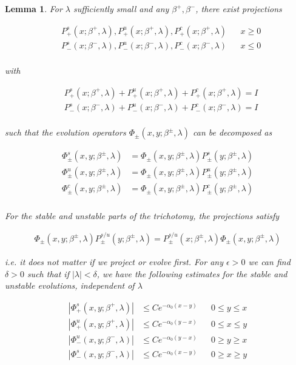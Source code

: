 \documentclass[12pt]{article}
\newtheorem{lemma}{Lemma}
\begin{document}
\begin{lemma}\label{trichotomy}
For $\lambda$ sufficiently small and any $\beta^+, \beta^-$, there exist projections

\begin{align*}
&P_+^s(x; \beta^+, \lambda), P_+^u(x; \beta^+, \lambda), P_+^c(x; \beta^+, \lambda) && x \geq 0 \\
&P_-^s(x; \beta^-, \lambda), P_-^u(x; \beta^-, \lambda), P_-^c(x; \beta^-, \lambda) && x \leq 0 \\
\end{align*}

with

\begin{align*}
&P_+^s(x; \beta^+, \lambda) + P_+^u(x; \beta^+, \lambda) + P_+^c(x; \beta^+, \lambda) = I \\
&P_-^s(x; \beta^-, \lambda) + P_-^u(x; \beta^-, \lambda) + P_-^c(x; \beta^-, \lambda) = I \\
\end{align*}

such that the evolution operators $\Phi_\pm(x, y; \beta^\pm, \lambda)$ can be decomposed as

\begin{align*}
\Phi^s_\pm(x, y; \beta^\pm, \lambda) &= \Phi_\pm(x, y; \beta^\pm, \lambda) P^s_\pm(y; \beta^\pm, \lambda) \\
\Phi^u_\pm(x, y; \beta^\pm, \lambda) &= \Phi_\pm(x, y; \beta^\pm, \lambda) P^u_\pm(y; \beta^\pm, \lambda) \\
\Phi^c_\pm(x, y; \beta^\pm, \lambda) &= \Phi_\pm(x, y; \beta^\pm, \lambda) P^c_\pm(y; \beta^\pm, \lambda) \\
\end{align*}

For the stable and unstable parts of the trichotomy, the projections satisfy 

\begin{align*}
\Phi_\pm(x, y; \beta^\pm, \lambda) P^{s/u}_\pm(y; \beta^\pm, \lambda) 
= P^{s/u}_\pm(x; \beta^\pm, \lambda) \Phi_\pm(x, y; \beta^\pm, \lambda)
\end{align*}

i.e. it does not matter if we project or evolve first. For any $\epsilon > 0$ we can find $\delta > 0$ such that if $|\lambda| < \delta$, we have the following estimates for the stable and unstable evolutions, independent of $\lambda$

\begin{align*}
|\Phi^s_+(x, y; \beta^+, \lambda)| &\leq C e^{-\alpha_0(x - y)} && 0 \leq y \leq x \\
|\Phi^u_+(x, y; \beta^+, \lambda)| &\leq C e^{-\alpha_0(y - x)} && 0 \leq x \leq y \\
|\Phi^u_-(x, y; \beta^-, \lambda)| &\leq C e^{-\alpha_0(y - x)} && 0 \geq y \geq x \\
|\Phi^s_-(x, y; \beta^-, \lambda)| &\leq C e^{-\alpha_0(x - y)} && 0 \geq x \geq y \\
\end{align*}


\end{lemma}
\end{document}
